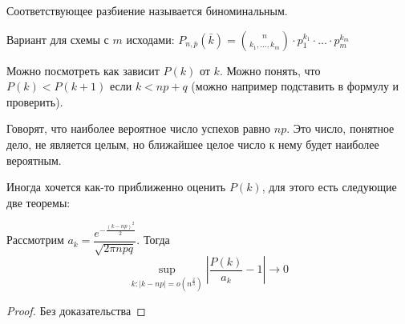 \begin{Def}
Соответствующее разбиение называется биноминальным.
\end{Def}

Вариант для схемы с $m$ исходами: $P_{n, \bar p}(\bar k) = \binom{n}{k_1, \dots, k_m} \cdot p_1^{k_1} \cdot \dots \cdot p_m^{k_m}$


Можно посмотреть как зависит $P(k)$ от $k$. Можно понять, что $P(k) < P(k + 1)$ если $k < np + q$ (можно например подставить в формулу и проверить).

Говорят, что наиболее вероятное число успехов равно $np$. Это число, понятное дело, не является целым, но ближайшее целое число к нему будет наиболее вероятным.

Иногда хочется как-то приближенно оценить $P(k)$, для этого есть следующие две теоремы:
\begin{theorem}
Рассмотрим $a_k = \dfrac{e^{-\frac{(k - np)^2}{2}}}{\sqrt{2\pi npq}}$. Тогда
$$\sup_{k\colon |k - np| = o(n^{\frac23})} |\frac{P(k)}{a_k} - 1| \to 0$$
\end{theorem}
\begin{proof}
Без доказательства
\end{proof}
